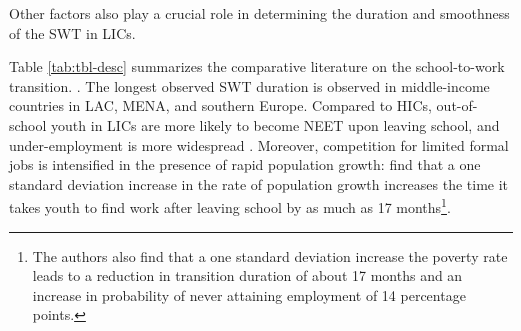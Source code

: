 \documentclass[
  a4paper, twoside, 12pt]{book}
\renewcommand{\hl}[1]{#1}
\newcommand{\hlc}[2][color]{}
\begin{document}
\hl{Other factors also play a crucial role in determining the duration and smoothness of the SWT in LICs.} \hlc[lightgray]{Rising education rates in SSA mechanically delay the transition: as increasing numbers of youth stay in school for longer, they enter the labour market at a more advanced age }\autocite{calves2013}\hlc[lightgray]{. More educated youth in SSA, especially university graduates, have been shown to be reluctant to work in the informal sector, preferring to wait for formal or public sector employment }\autocite{serneels2007}\hlc[lightgray]{. Education mismatch may also prolong the SWT: if education systems are not aligned with the demands of the labour market, students may graduate with skills that are not in high demand, slowing the transition to wage work and increasing unemployment and underemployment for the most educated youth.} \textcite{bandara2019}\hlc[lightgray]{, using eight SWTS surveys from SSA (including Bénin), report that about 47 and 28 percent of employed youth in their sample are overqualified and under-qualified for their jobs, respectively. Finally, }\textcite{manacorda2017}\hlc[lightgray]{ report that women generally experience longer transition duration and are more likely to exit the labour market before completing the transition, taking twice as long as men to become employed after leaving school in certain LICs.}

 \hl{Table }\ref{tab:tbl-desc} \hl{summarizes the comparative literature on the school-to-work transition.} \hlc[lightgray]{Though there is much heterogeneity in the data, youth from the highest-income and lowest-income countries are observed to have relatively short school-to-work transitions, though youth in HICs stay in school longer and have lower rates of inactivity after school-leaving }\autocite{manacorda2017,quintini2014}. The longest observed SWT duration is observed in middle-income countries in LAC, MENA, and southern Europe. Compared to HICs, out-of-school youth in LICs are more likely to become NEET upon leaving school, and under-employment is more widespread \autocite{quintini2014}. Moreover, competition for limited formal jobs is intensified in the presence of rapid population growth: \textcite{manacorda2017} find that a one standard deviation increase in the rate of population growth increases the time it takes youth to find work after leaving school by as much as 17 months\footnote{The authors also find that a one standard deviation increase the poverty rate leads to a reduction in transition duration of about 17 months and an increase in probability of never attaining employment of 14 percentage points.}.
\end{document}
